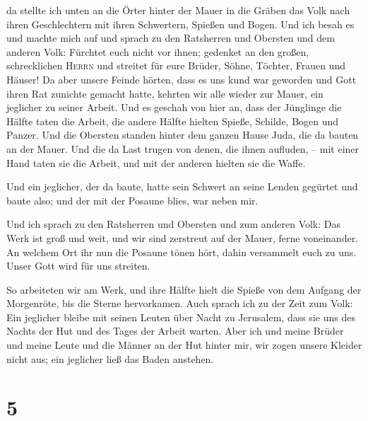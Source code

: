  da stellte ich unten an die Örter hinter der Mauer in die
Gräben das Volk nach ihren Geschlechtern mit ihren Schwertern, Spießen
und Bogen.  Und ich besah es und machte mich auf und
sprach zu den Ratsherren und Obersten und dem anderen Volk: Fürchtet
euch nicht vor ihnen; gedenket an den großen, schrecklichen
\textsc{Herrn} und streitet für eure Brüder, Söhne, Töchter, Frauen und
Häuser!  Da aber unsere Feinde hörten, dass es uns kund
war geworden und Gott ihren Rat zunichte gemacht hatte, kehrten wir alle
wieder zur Mauer, ein jeglicher zu seiner Arbeit.  Und es
geschah von hier an, dass der Jünglinge die Hälfte taten die Arbeit, die
andere Hälfte hielten Spieße, Schilde, Bogen und Panzer. Und die
Obersten standen hinter dem ganzen Hause Juda,  die da
bauten an der Mauer. Und die da Last trugen von denen, die ihnen
aufluden, -- mit einer Hand taten sie die Arbeit, und mit der anderen
hielten sie die Waffe.

 Und ein jeglicher, der da baute, hatte sein Schwert an
seine Lenden gegürtet und baute also; und der mit der Posaune blies, war
neben mir.

 Und ich sprach zu den Ratsherren und Obersten und zum
anderen Volk: Das Werk ist groß und weit, und wir sind zerstreut auf der
Mauer, ferne voneinander.  An welchem Ort ihr nun die
Posaune tönen hört, dahin versammelt euch zu uns. Unser Gott wird für
uns streiten.

 So arbeiteten wir am Werk, und ihre Hälfte hielt die
Spieße von dem Aufgang der Morgenröte, bis die Sterne hervorkamen.
 Auch sprach ich zu der Zeit zum Volk: Ein jeglicher
bleibe mit seinen Leuten über Nacht zu Jerusalem, dass sie uns des
Nachts der Hut und des Tages der Arbeit warten.  Aber ich
und meine Brüder und meine Leute und die Männer an der Hut hinter mir,
wir zogen unsere Kleider nicht aus; ein jeglicher ließ das Baden
anstehen.

\hypertarget{section-4}{%
\section{5}\label{section-4}}

